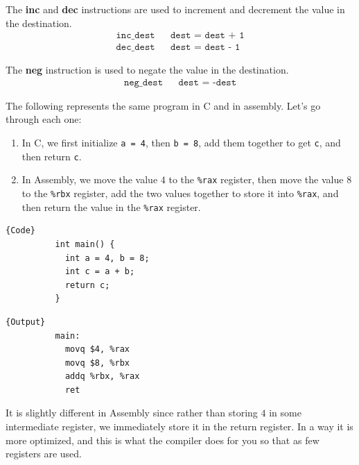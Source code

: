 \documentclass{article}
\begin{document}
      \begin{definition}
        The \textbf{inc} and \textbf{dec} instructions are used to increment and decrement the value in the destination. 
        \begin{align*}
          \texttt{inc\_ dest} && \texttt{dest = dest + 1} \\
          \texttt{dec\_ dest} && \texttt{dest = dest - 1}
        \end{align*}
      \end{definition}

      \begin{definition}[Negative]
        The \textbf{neg} instruction is used to negate the value in the destination. 
        \begin{align*}
          \texttt{neg\_ dest} && \texttt{dest = -dest} 
        \end{align*}
      \end{definition}

      \begin{example}
        The following represents the same program in C and in assembly. Let's go through each one: 
        \begin{enumerate}
          \item In C, we first initialize \texttt{a = 4}, then \texttt{b = 8}, add them together to get \texttt{c}, and then return \texttt{c}.
          \item In Assembly, we move the value $4$ to the \texttt{\%rax} register, then move the value $8$ to the \texttt{\%rbx} register, add the two values together to store it into \texttt{\%rax}, and then return the value in the \texttt{\%rax} register.
        \end{enumerate}
        \noindent\begin{minipage}{.5\textwidth}
        \begin{lstlisting}[]{Code}
          int main() {
            int a = 4, b = 8; 
            int c = a + b; 
            return c; 
          }
        \end{lstlisting}
        \end{minipage}
        \hfill
        \begin{minipage}{.49\textwidth}
        \begin{lstlisting}[]{Output}
          main:
            movq $4, %rax
            movq $8, %rbx
            addq %rbx, %rax
            ret
        \end{lstlisting}
        \end{minipage}
        It is slightly different in Assembly since rather than storing $4$ in some intermediate register, we immediately store it in the return register. In a way it is more optimized, and this is what the compiler does for you so that as few registers are used. 
      \end{example}
\end{document}
